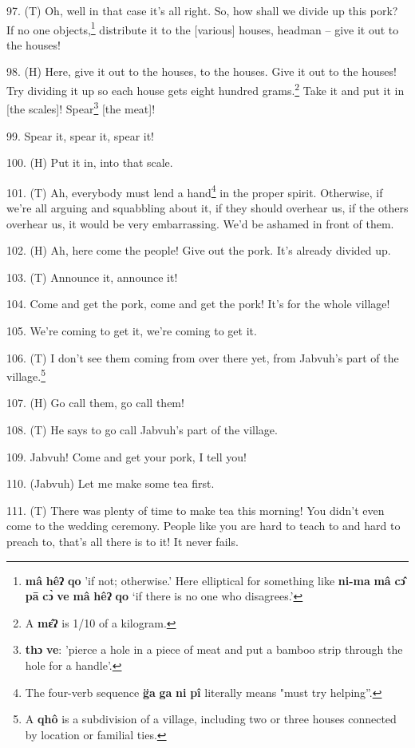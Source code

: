 97. (T) Oh, well in that case it's all right. So, how shall we divide up this pork?
If no one objects,\footnote{\textbf{mâ} \textbf{hêʔ} \textbf{qo} 'if not; otherwise.' Here elliptical for something like \textbf{ni-ma} \textbf{mâ} \textbf{cɔ̂} \textbf{pā} \textbf{cɔ̀} \textbf{ve} \textbf{mâ} \textbf{hêʔ} \textbf{qo} `if there is no one who disagrees.'} distribute it to the [various] houses, headman -- give it
out to the houses!

98. (H) Here, give it out to the houses, to the houses. Give it out to the houses!
Try dividing it up so each house gets eight hundred grams.\footnote{A \textbf{mɛ̂ʔ} is 1/10 of a kilogram.} Take it and put
it in [the scales]! Spear\footnote{\textbf{thɔ} \textbf{ve}: 'pierce a hole in a piece of meat and put a bamboo strip through the hole for a handle'.} [the meat]!

99. Spear it, spear it, spear it!

100. (H) Put it in, into that scale.

101. (T) Ah, everybody must lend a hand\footnote{The four-verb sequence \textbf{g̈a} \textbf{ga} \textbf{ni} \textbf{pî} literally means "must try helping''.} in the proper spirit. Otherwise, if
we're all arguing and squabbling about it, if they should overhear us, if the others
overhear us, it would be very embarrassing. We'd be ashamed in front of them.

102. (H) Ah, here come the people! Give out the pork. It's already divided up.

103. (T) Announce it, announce it!

104. Come and get the pork, come and get the pork! It's for the whole village!

105. We're coming to get it, we're coming to get it.

106. (T) I don't see them coming from over there yet, from Jabvuh's part of the
village.\footnote{A \textbf{qhô} is a subdivision of a village, including two or three houses connected by location or familial ties.}

107. (H) Go call them, go call them!

108. (T) He says to go call Jabvuh's part of the village.

109. Jabvuh! Come and get your pork, I tell you!

110. (Jabvuh)  Let me make some tea first.

111. (T) There was plenty of time to make tea this morning! You didn't even come
to the wedding ceremony. People like you are hard to teach to and hard to preach
to, that's all there is to it! It never fails.

